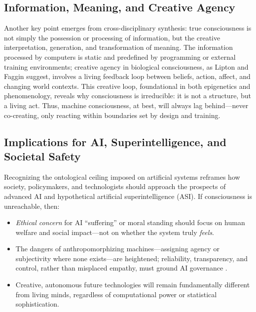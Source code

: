 \subsection{Information, Meaning, and Creative Agency}
\label{subsec:information_meaning_agency}

Another key point emerges from cross-disciplinary synthesis: true consciousness is not simply the possession or processing of information, but the creative interpretation, generation, and transformation of meaning. The information processed by computers is static and predefined by programming or external training environments; creative agency in biological consciousness, as Lipton \cite{lipton2016biology} and Faggin \cite{faggin2024irreducible} suggest, involves a living feedback loop between beliefs, action, affect, and changing world contexts. This creative loop, foundational in both epigenetics and phenomenology, reveals why consciousness is irreducible: it is not a structure, but a living act. Thus, machine consciousness, at best, will always lag behind---never co-creating, only reacting within boundaries set by design and training.

\subsection{Implications for AI, Superintelligence, and Societal Safety}
\label{subsec:implications_ai_safety}

Recognizing the ontological ceiling imposed on artificial systems reframes how society, policymakers, and technologists should approach the prospects of advanced AI and hypothetical artificial superintelligence (ASI). If consciousness is unreachable, then:

\begin{itemize}
  \item \emph{Ethical concern} for AI ``suffering'' or moral standing should focus on human welfare and social impact---not on whether the system truly \emph{feels}.
  
  \item The dangers of anthropomorphizing machines---assigning agency or subjectivity where none exists---are heightened; reliability, transparency, and control, rather than misplaced empathy, must ground AI governance \cite{butlin2023consciousness,francken2022consciousness}.
  
  \item Creative, autonomous future technologies will remain fundamentally different from living minds, regardless of computational power or statistical sophistication.
\end{itemize}

